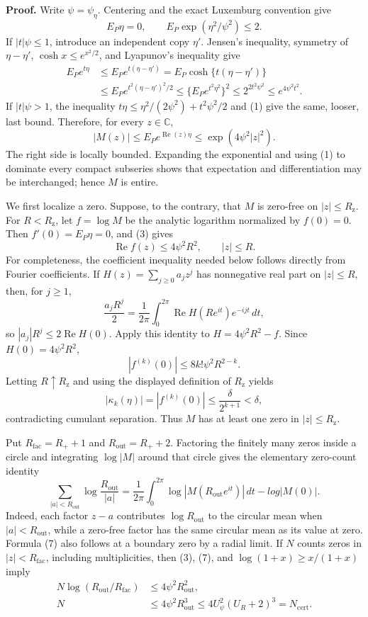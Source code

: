 \textbf{Proof.}
Write \(\psi=\psi_\eta\).  Centering and the exact Luxemburg convention give
\[
 E_P\eta=0,
 \qquad E_P\exp(\eta^2/\psi^2)\le2. \tag{1}
\]
If \(|t|\psi\le1\), introduce an independent copy \(\eta'\).  Jensen's inequality, symmetry of \(\eta-\eta'\), \(\cosh x\le e^{x^2/2}\), and Lyapunov's inequality give
\[
 \begin{aligned}
 E_Pe^{t\eta}
 &\le E_Pe^{t(\eta-\eta')}
 =E_P\cosh\{t(\eta-\eta')\}\\
 &\le E_Pe^{t^2(\eta-\eta')^2/2}
 \le \{E_Pe^{t^2\eta^2}\}^2
 \le 2^{2t^2\psi^2}
 \le e^{4\psi^2t^2}.
 \end{aligned} \tag{2}
\]
If \(|t|\psi>1\), the inequality \(t\eta\le \eta^2/(2\psi^2)+t^2\psi^2/2\) and (1) give the same, looser, last bound.  Therefore, for every \(z\in\mathbb C\),
\[
 |M(z)|\le E_Pe^{\operatorname{Re}(z)\eta}
 \le \exp(4\psi^2|z|^2). \tag{3}
\]
The right side is locally bounded.  Expanding the exponential and using (1) to dominate every compact subseries shows that expectation and differentiation may be interchanged; hence \(M\) is entire.

We first localize a zero.  Suppose, to the contrary, that \(M\) is zero-free on \(|z|\le R_{\mathrm z}\).  For \(R<R_{\mathrm z}\), let \(f=\log M\) be the analytic logarithm normalized by \(f(0)=0\).  Then \(f'(0)=E_P\eta=0\), and (3) gives
\[
 \operatorname{Re}f(z)\le4\psi^2R^2,
 \qquad |z|\le R. \tag{4}
\]
For completeness, the coefficient inequality needed below follows directly from Fourier coefficients.  If \(H(z)=\sum_{j\ge0}a_jz^j\) has nonnegative real part on \(|z|\le R\), then, for \(j\ge1\),
\[
 \frac{a_jR^j}{2}
 =\frac1{2\pi}\int_0^{2\pi}\operatorname{Re}H(Re^{it})e^{-ijt}\,dt,
\]
so \(|a_j|R^j\le2\operatorname{Re}H(0)\).  Apply this identity to \(H=4\psi^2R^2-f\).  Since \(H(0)=4\psi^2R^2\),
\[
 |f^{(k)}(0)|\le8k!\psi^2R^{2-k}. \tag{5}
\]
Letting \(R\uparrow R_{\mathrm z}\) and using the displayed definition of \(R_{\mathrm z}\) yields
\[
 |\kappa_k(\eta)|=|f^{(k)}(0)|
 \le \frac{\delta}{2^{k+1}}<\delta, \tag{6}
\]
contradicting cumulant separation.  Thus \(M\) has at least one zero in \(|z|\le R_{\mathrm z}\).

Put \(R_{\mathrm{fac}}=R_++1\) and \(R_{\mathrm{out}}=R_++2\).  Factoring the finitely many zeros inside a circle and integrating \(\log|M|\) around that circle gives the elementary zero-count identity
\[
 \sum_{|a|<R_{\mathrm{out}}}\log\frac{R_{\mathrm{out}}}{|a|}
 =\frac1{2\pi}\int_0^{2\pi}\log|M(R_{\mathrm{out}}e^{it})|\,dt-log|M(0)|. \tag{7}
\]
Indeed, each factor \(z-a\) contributes \(\log R_{\mathrm{out}}\) to the circular mean when \(|a|<R_{\mathrm{out}}\), while a zero-free factor has the same circular mean as its value at zero.  Formula (7) also follows at a boundary zero by a radial limit.  If \(N\) counts zeros in \(|z|<R_{\mathrm{fac}}\), including multiplicities, then (3), (7), and \(\log(1+x)\ge x/(1+x)\) imply
\[
 \begin{aligned}
 N\log(R_{\mathrm{out}}/R_{\mathrm{fac}})
 &\le4\psi^2R_{\mathrm{out}}^2,\\
 N&\le4\psi^2R_{\mathrm{out}}^3
 \le4U_\psi^2(U_R+2)^3=N_{\mathrm{cert}}. 
 \end{aligned} \tag{8}
\]

